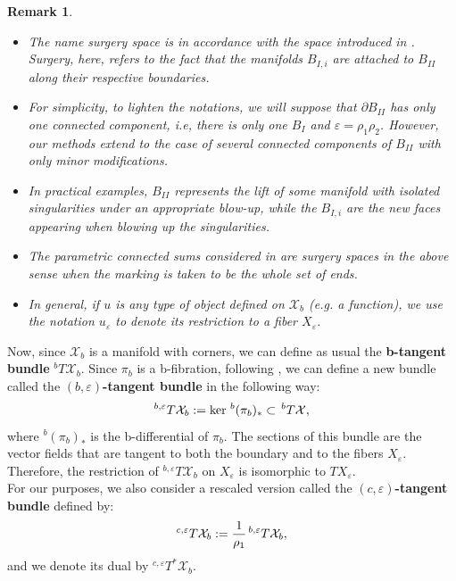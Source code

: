 \documentclass[a4paper,11pt]{article}
\newcounter{mythm}[section]
\newtheorem{rem}[mythm]{Remark}
\begin{document}
\begin{rem}
\hfill
\begin{itemize}
\item The name surgery space is in accordance with the space introduced in \cite{melrose_analytic_1995}. Surgery, here, refers to the fact that the manifolds $B_{I,i}$ are attached to $B_{II}$ along their respective boundaries.
\item For simplicity, to lighten the notations, we will suppose that $\partial B_{II}$ has only one connected component, i.e, there is only one $B_I$ and $\varepsilon = \rho_1 \rho_2$. However, our methods extend to the case of several connected components of $B_{II}$ with only minor modifications.
\item 
In practical examples, $B_{II}$ represents the lift of some manifold with isolated singularities under an appropriate blow-up, while the $B_{I,i}$ are the new faces appearing when blowing up the singularities.
\item The parametric connected sums considered in \cite[Definition 7.6]{pacini_desingularizing_2013} are surgery spaces in the above sense when the marking is taken to be the whole set of ends.
\item In general, if $u$ is any type of object defined on $\mathcal{X}_b$ (e.g. a function), we use the notation $u_\varepsilon$ to denote its restriction to a fiber $X_\varepsilon$.
\end{itemize}
\end{rem}
 Now, since $\mathcal{X}_b$ is a manifold with corners, we can define as usual the \textbf{b-tangent bundle} $^{b} T \mathcal{X}_b$. Since $\pi_{b}$ is a b-fibration, following \cite{melrose_analytic_1995}, we can define a new bundle called the \textbf{$(b, \varepsilon)$-tangent bundle} in the following way: 
$$
^{b,\varepsilon} T \mathcal{X}_b := \ker \hspace{0.05cm} ^{b} (\pi_{b})_{*} \subset \hspace{0.05cm} ^{b} T \mathcal{X},
$$
where $^{b} (\pi_{b})_{*}$ is the b-differential of $\pi_{b}$. The sections of this bundle are the vector fields that are tangent to both the boundary and to the fibers $X_\varepsilon$. Therefore, the restriction of  $^{b,\varepsilon} T \mathcal{X}_b$ on $X_\varepsilon$ is isomorphic to $TX_\varepsilon$.\\
For our purposes, we also consider a rescaled version called the \textbf{$(c, \varepsilon)$-tangent bundle} defined by: 
$$
^{c,\varepsilon} T \mathcal{X}_b := \frac{1}{\rho_{1}} \hspace{0.05cm} ^{b,\varepsilon} T \mathcal{X}_b,
$$
and we denote its dual by $^{c,\varepsilon} T^{*} \mathcal{X}_b$.
\end{document}
